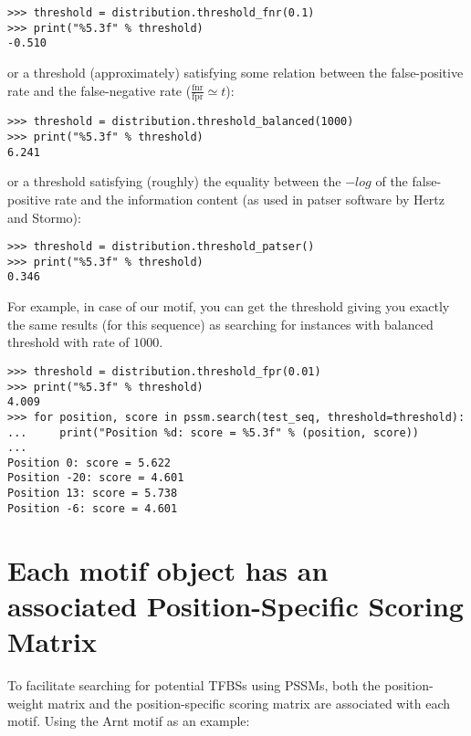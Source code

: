 \begin{verbatim}
>>> threshold = distribution.threshold_fnr(0.1)
>>> print("%5.3f" % threshold)
-0.510
\end{verbatim}
or a threshold (approximately) satisfying some relation between the false-positive rate and the false-negative rate ($\frac{\textrm{fnr}}{\textrm{fpr}}\simeq t$):

\begin{verbatim}
>>> threshold = distribution.threshold_balanced(1000)
>>> print("%5.3f" % threshold)
6.241
\end{verbatim}
or a threshold satisfying (roughly) the equality between the $-log$ of the
false-positive rate and the information content (as used in patser software by
Hertz and Stormo):

\begin{verbatim}
>>> threshold = distribution.threshold_patser()
>>> print("%5.3f" % threshold)
0.346
\end{verbatim}

For example, in case of our motif, you can get the threshold giving
you exactly the same results (for this sequence) as searching for
instances with balanced threshold with rate of $1000$.

\begin{verbatim}
>>> threshold = distribution.threshold_fpr(0.01)
>>> print("%5.3f" % threshold)
4.009
>>> for position, score in pssm.search(test_seq, threshold=threshold):
...     print("Position %d: score = %5.3f" % (position, score))
...
Position 0: score = 5.622
Position -20: score = 4.601
Position 13: score = 5.738
Position -6: score = 4.601
\end{verbatim}

\section{Each motif object has an associated Position-Specific Scoring Matrix}

To facilitate searching for potential TFBSs using PSSMs, both the position-weight matrix and the position-specific scoring matrix are associated with each motif. Using the Arnt motif as an example:

